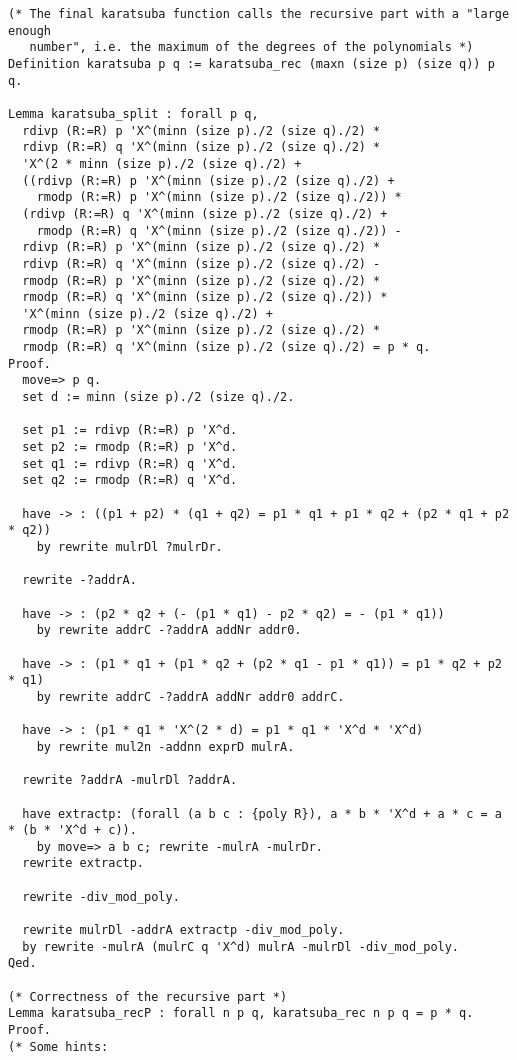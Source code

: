 \begin{verbatim}
(* The final karatsuba function calls the recursive part with a "large enough
   number", i.e. the maximum of the degrees of the polynomials *)
Definition karatsuba p q := karatsuba_rec (maxn (size p) (size q)) p q.

Lemma karatsuba_split : forall p q,
  rdivp (R:=R) p 'X^(minn (size p)./2 (size q)./2) *
  rdivp (R:=R) q 'X^(minn (size p)./2 (size q)./2) *
  'X^(2 * minn (size p)./2 (size q)./2) +
  ((rdivp (R:=R) p 'X^(minn (size p)./2 (size q)./2) +
    rmodp (R:=R) p 'X^(minn (size p)./2 (size q)./2)) *
  (rdivp (R:=R) q 'X^(minn (size p)./2 (size q)./2) +
    rmodp (R:=R) q 'X^(minn (size p)./2 (size q)./2)) -
  rdivp (R:=R) p 'X^(minn (size p)./2 (size q)./2) *
  rdivp (R:=R) q 'X^(minn (size p)./2 (size q)./2) -
  rmodp (R:=R) p 'X^(minn (size p)./2 (size q)./2) *
  rmodp (R:=R) q 'X^(minn (size p)./2 (size q)./2)) *
  'X^(minn (size p)./2 (size q)./2) +
  rmodp (R:=R) p 'X^(minn (size p)./2 (size q)./2) *
  rmodp (R:=R) q 'X^(minn (size p)./2 (size q)./2) = p * q.
Proof.
  move=> p q.
  set d := minn (size p)./2 (size q)./2.

  set p1 := rdivp (R:=R) p 'X^d.
  set p2 := rmodp (R:=R) p 'X^d.
  set q1 := rdivp (R:=R) q 'X^d.
  set q2 := rmodp (R:=R) q 'X^d.

  have -> : ((p1 + p2) * (q1 + q2) = p1 * q1 + p1 * q2 + (p2 * q1 + p2 * q2))
    by rewrite mulrDl ?mulrDr.

  rewrite -?addrA.

  have -> : (p2 * q2 + (- (p1 * q1) - p2 * q2) = - (p1 * q1))
    by rewrite addrC -?addrA addNr addr0.

  have -> : (p1 * q1 + (p1 * q2 + (p2 * q1 - p1 * q1)) = p1 * q2 + p2 * q1)
    by rewrite addrC -?addrA addNr addr0 addrC.

  have -> : (p1 * q1 * 'X^(2 * d) = p1 * q1 * 'X^d * 'X^d)
    by rewrite mul2n -addnn exprD mulrA.

  rewrite ?addrA -mulrDl ?addrA.

  have extractp: (forall (a b c : {poly R}), a * b * 'X^d + a * c = a * (b * 'X^d + c)).
    by move=> a b c; rewrite -mulrA -mulrDr.
  rewrite extractp.

  rewrite -div_mod_poly.

  rewrite mulrDl -addrA extractp -div_mod_poly.
  by rewrite -mulrA (mulrC q 'X^d) mulrA -mulrDl -div_mod_poly.
Qed.

(* Correctness of the recursive part *)
Lemma karatsuba_recP : forall n p q, karatsuba_rec n p q = p * q.
Proof.
(* Some hints:


\end{verbatim}
